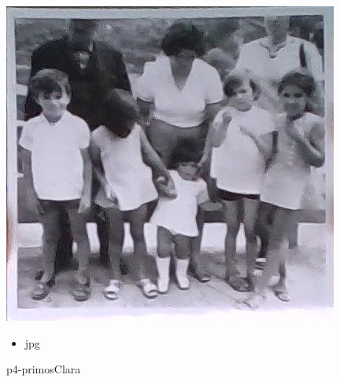 \documentclass{article}
\begin{document}
		\begin{figure}[ht!]
		\begin{minipage}{0.35\textwidth}
			\centering
			\includegraphics[width=\linewidth]{ManuelVilar/ClaraVilar/p4-primosClara.jpg}
			\caption{ p4-primosClara }
		\end{minipage}
		\hspace{1cm} %
		\begin{minipage}{0.3\textwidth}
			\begin{tcolorbox}[colback=white, colframe=black, boxrule=1pt]
				\begin{itemize}
					\item jpg
                    
				\end{itemize}

			\end{tcolorbox}
		\end{minipage}
	\end{figure}
	
\end{document}
